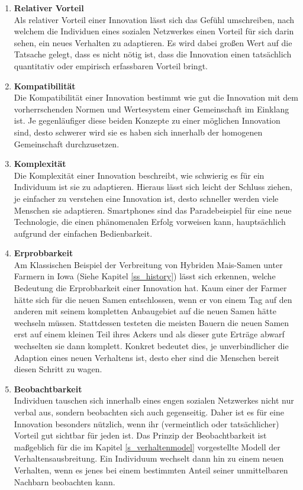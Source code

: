 \documentclass[12pt]{article}
\begin{document}
\begin{enumerate}
\item \textbf{Relativer Vorteil}\\ Als relativer Vorteil einer Innovation lässt sich das Gefühl umschreiben, nach welchem die Individuen eines sozialen Netzwerkes einen Vorteil für sich darin sehen, ein neues Verhalten zu adaptieren. Es wird dabei großen Wert auf die Tatsache gelegt, dass es nicht nötig ist, dass die Innovation einen tatsächlich quantitativ oder empirisch erfassbaren Vorteil bringt.
\item \textbf{Kompatibilität}\\ Die Kompatibilität einer Innovation bestimmt wie gut die Innovation mit dem vorherrschenden Normen und Wertesystem einer Gemeinschaft im Einklang ist. Je gegenläufiger diese beiden Konzepte zu einer möglichen Innovation sind, desto schwerer wird sie es haben sich innerhalb der homogenen Gemeinschaft durchzusetzen.
\item \textbf{Komplexität}\\ Die Komplexität einer Innovation beschreibt, wie schwierig es für ein Individuum ist sie zu adaptieren. Hieraus lässt sich leicht der Schluss ziehen, je einfacher zu verstehen eine Innovation ist, desto schneller werden viele Menschen sie adaptieren. Smartphones sind das Paradebeispiel für eine neue Technologie, die einen phänomenalen Erfolg vorweisen kann, hauptsächlich aufgrund der einfachen Bedienbarkeit.
\item \textbf{Erprobbarkeit} \\ Am Klassischen Beispiel der Verbreitung von Hybriden Mais-Samen unter Farmern in Iowa (Siehe Kapitel \ref{ss_history}) lässt sich erkennen, welche Bedeutung die Erprobbarkeit einer Innovation hat. Kaum einer der Farmer hätte sich für die neuen Samen entschlossen, wenn er von einem Tag auf den anderen mit seinem kompletten Anbaugebiet auf die neuen Samen hätte wechseln müssen. Stattdessen testeten die meisten Bauern die neuen Samen erst auf einem kleinen Teil ihres Ackers und als dieser gute Erträge abwarf wechselten sie dann komplett. Konkret bedeutet dies, je unverbindlicher die Adaption eines neuen Verhaltens ist, desto eher sind die Menschen bereit diesen Schritt zu wagen.
\item \textbf{Beobachtbarkeit} \\ Individuen tauschen sich innerhalb eines engen sozialen Netzwerkes nicht nur verbal aus, sondern beobachten sich auch gegenseitig. Daher ist es für eine Innovation besonders nützlich, wenn ihr (vermeintlich oder tatsächlicher) Vorteil gut sichtbar für jeden ist. Das Prinzip der Beobachtbarkeit ist maßgeblich für die im Kapitel \ref{s_verhaltenmodel} vorgestellte Modell der Verhaltensausbreitung. Ein Individuum wechselt dann hin zu einem neuen Verhalten, wenn es jenes bei einem bestimmten Anteil seiner unmittelbaren Nachbarn beobachten kann.
\end{enumerate}
\end{document}
